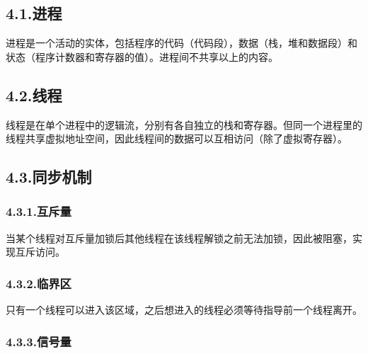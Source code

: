 \documentclass{article}
\begin{document}
\subsection{4.1.\hspace*{0.5em}进程}\label{section}%

\noindent{}进程是一个活动的实体，包括程序的代码（代码段），数据（栈，堆和数据段）和状态（程序计数器和寄存器的值）。进程间不共享以上的内容。%

\subsection{4.2.\hspace*{0.5em}线程}\label{section}%

\noindent{}线程是在单个进程中的逻辑流，分别有各自独立的栈和寄存器。但同一个进程里的线程共享虚拟地址空间，因此线程间的数据可以互相访问（除了虚拟寄存器）。%

\subsection{4.3.\hspace*{0.5em}同步机制}\label{section}%

\subsubsection{4.3.1.\hspace*{0.5em}互斥量}\label{section}%

\noindent{}当某个线程对互斥量加锁后其他线程在该线程解锁之前无法加锁，因此被阻塞，实现互斥访问。%

\subsubsection{4.3.2.\hspace*{0.5em}临界区}\label{section}%

\noindent{}只有一个线程可以进入该区域，之后想进入的线程必须等待指导前一个线程离开。%

\subsubsection{4.3.3.\hspace*{0.5em}信号量}\label{section}%
\end{document}
